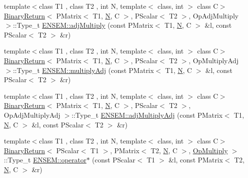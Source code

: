 \begin{DoxyCompactItemize}
\item 
{\footnotesize template$<$class T1 , class T2 , int N, template$<$ class, int $>$ class C$>$ }\\\mbox{\hyperlink{structBinaryReturn}{Binary\+Return}}$<$ P\+Matrix$<$ T1, \mbox{\hyperlink{adat__devel_2lib_2hadron_2operator__name__util_8cc_a7722c8ecbb62d99aee7ce68b1752f337}{N}}, C $>$, P\+Scalar$<$ T2 $>$, Op\+Adj\+Multiply $>$\+::Type\+\_\+t \mbox{\hyperlink{group__primmatrix_ga47a69844104af73a48b189fb08811b87}{E\+N\+S\+E\+M\+::adj\+Multiply}} (const P\+Matrix$<$ T1, \mbox{\hyperlink{adat__devel_2lib_2hadron_2operator__name__util_8cc_a7722c8ecbb62d99aee7ce68b1752f337}{N}}, C $>$ \&l, const P\+Scalar$<$ T2 $>$ \&r)
\item 
{\footnotesize template$<$class T1 , class T2 , int N, template$<$ class, int $>$ class C$>$ }\\\mbox{\hyperlink{structBinaryReturn}{Binary\+Return}}$<$ P\+Matrix$<$ T1, \mbox{\hyperlink{adat__devel_2lib_2hadron_2operator__name__util_8cc_a7722c8ecbb62d99aee7ce68b1752f337}{N}}, C $>$, P\+Scalar$<$ T2 $>$, Op\+Multiply\+Adj $>$\+::Type\+\_\+t \mbox{\hyperlink{group__primmatrix_ga1635949cdf21523d1c8bdb6d5ada65a8}{E\+N\+S\+E\+M\+::multiply\+Adj}} (const P\+Matrix$<$ T1, \mbox{\hyperlink{adat__devel_2lib_2hadron_2operator__name__util_8cc_a7722c8ecbb62d99aee7ce68b1752f337}{N}}, C $>$ \&l, const P\+Scalar$<$ T2 $>$ \&r)
\item 
{\footnotesize template$<$class T1 , class T2 , int N, template$<$ class, int $>$ class C$>$ }\\\mbox{\hyperlink{structBinaryReturn}{Binary\+Return}}$<$ P\+Matrix$<$ T1, \mbox{\hyperlink{adat__devel_2lib_2hadron_2operator__name__util_8cc_a7722c8ecbb62d99aee7ce68b1752f337}{N}}, C $>$, P\+Scalar$<$ T2 $>$, Op\+Adj\+Multiply\+Adj $>$\+::Type\+\_\+t \mbox{\hyperlink{group__primmatrix_gada4da32758440b83d445ae4a0e14297e}{E\+N\+S\+E\+M\+::adj\+Multiply\+Adj}} (const P\+Matrix$<$ T1, \mbox{\hyperlink{adat__devel_2lib_2hadron_2operator__name__util_8cc_a7722c8ecbb62d99aee7ce68b1752f337}{N}}, C $>$ \&l, const P\+Scalar$<$ T2 $>$ \&r)
\item 
{\footnotesize template$<$class T1 , class T2 , int N, template$<$ class, int $>$ class C$>$ }\\\mbox{\hyperlink{structBinaryReturn}{Binary\+Return}}$<$ P\+Scalar$<$ T1 $>$, P\+Matrix$<$ T2, \mbox{\hyperlink{adat__devel_2lib_2hadron_2operator__name__util_8cc_a7722c8ecbb62d99aee7ce68b1752f337}{N}}, C $>$, \mbox{\hyperlink{structOpMultiply}{Op\+Multiply}} $>$\+::Type\+\_\+t \mbox{\hyperlink{group__primmatrix_ga2f9521924540b40d00ad4aa1606bfb22}{E\+N\+S\+E\+M\+::operator$\ast$}} (const P\+Scalar$<$ T1 $>$ \&l, const P\+Matrix$<$ T2, \mbox{\hyperlink{adat__devel_2lib_2hadron_2operator__name__util_8cc_a7722c8ecbb62d99aee7ce68b1752f337}{N}}, C $>$ \&r)

\end{DoxyCompactItemize}
